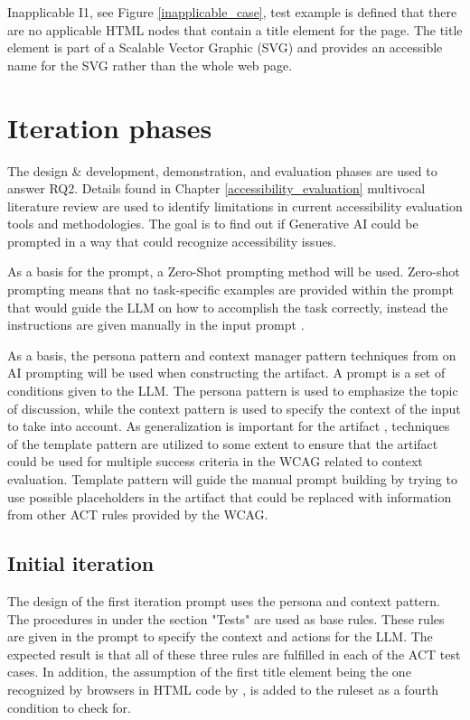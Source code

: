 Inapplicable I1, see Figure \ref{inapplicable_case}, test example is defined that there are no applicable HTML nodes that contain a title element for the page. The title element is part of a Scalable Vector Graphic (SVG) and provides an accessible name for the SVG rather than the whole web page.


\section{Iteration phases}

The design \& development, demonstration, and evaluation phases are used to answer RQ2. Details found in Chapter \ref{accessibility_evaluation} multivocal literature review are used to identify limitations in current accessibility evaluation tools and methodologies. The goal is to find out if Generative AI could be prompted in a way that could recognize accessibility issues. 

As a basis for the prompt, a Zero-Shot prompting method will be used. Zero-shot prompting means that no task-specific examples are provided within the prompt that would guide the LLM on how to accomplish the task correctly, instead the instructions are given manually in the input prompt \citep{kojima2023large}.

As a basis, the persona pattern and context manager pattern techniques from \textcite{white2023prompt} on AI prompting will be used when constructing the artifact. A prompt is a set of conditions given to the LLM. The persona pattern is used to emphasize the topic of discussion, while the context pattern is used to specify the context of the input to take into account. As generalization is important for the artifact \citep{design_science_eval}, techniques of the template pattern are utilized to some extent to ensure that the artifact could be used for multiple success criteria in the WCAG related to context evaluation. Template pattern will guide the manual prompt building by trying to use possible placeholders in the artifact that could be replaced with information from other ACT rules provided by the WCAG.

\subsection{Initial iteration}

The design of the first iteration prompt uses the persona and context pattern. The procedures in \textcite{g88} under the section "Tests" are used as base rules. These rules are given in the prompt to specify the context and actions for the LLM. The expected result is that all of these three rules are fulfilled in each of the ACT test cases. In addition, the assumption of the first title element being the one recognized by browsers in HTML code by \textcite{act_rule_g88}, is added to the ruleset as a fourth condition to check for.

